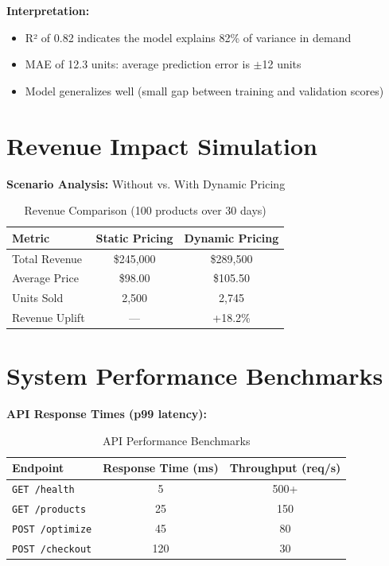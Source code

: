 \documentclass[12pt,a4paper]{report}
\begin{document}
\textbf{Interpretation:}
\begin{itemize}[leftmargin=2em]
    \item R² of 0.82 indicates the model explains 82\% of variance in demand
    \item MAE of 12.3 units: average prediction error is $\pm$12 units
    \item Model generalizes well (small gap between training and validation scores)
\end{itemize}

\section{Revenue Impact Simulation}

\textbf{Scenario Analysis:} Without vs. With Dynamic Pricing

\begin{table}[H]
    \centering
    \caption{Revenue Comparison (100 products over 30 days)}
    \begin{tabular}{|l|c|c|}
    \hline
    \textbf{Metric} & \textbf{Static Pricing} & \textbf{Dynamic Pricing} \\
    \hline
    Total Revenue & \$245,000 & \$289,500 \\
    Average Price & \$98.00 & \$105.50 \\
    Units Sold & 2,500 & 2,745 \\
    Revenue Uplift & — & +18.2\% \\
    \hline
    \end{tabular}
\end{table}

\section{System Performance Benchmarks}

\textbf{API Response Times (p99 latency):}

\begin{table}[H]
    \centering
    \caption{API Performance Benchmarks}
    \begin{tabular}{|l|c|c|}
    \hline
    \textbf{Endpoint} & \textbf{Response Time (ms)} & \textbf{Throughput (req/s)} \\
    \hline
    \texttt{GET /health} & 5 & 500+ \\
    \texttt{GET /products} & 25 & 150 \\
    \texttt{POST /optimize} & 45 & 80 \\
    \texttt{POST /checkout} & 120 & 30 \\
    \hline
    \end{tabular}
\end{table}
\end{document}
